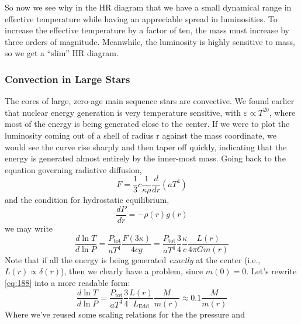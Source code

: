 \documentclass[10pt]{article}
\numberwithin{equation}{section}
\newcommand{\n}{\noindent}
\begin{document}
		\n So now we see why in the HR diagram that we have a small dynamical range
		in effective temperature while having an appreciable spread in luminosities.
		To increase the effective temperature by a factor of ten, the mass must
		increase by three orders of magnitude. Meanwhile, the luminosity is highly
		sensitive to mass, so we get a ``slim'' HR diagram.

    \subsubsection{Convection in Large Stars}
    \label{sec:conv-large-stars}

    The cores of large, zero-age main sequence stars are
    convective. We found earlier that nuclear energy generation is very
    temperature sensitive, with $\varepsilon\propto T^{20}$, where
    most of the energy is being generated close to the center. If we
    were to plot the luminosity coming out of a shell of radius r
    against the mass coordinate, we would see the curve rise sharply
    and then taper off quickly, indicating that the energy is
    generated almost entirely by the inner-most mass. Going back to
    the equation governing radiative diffusion, 
    \begin{equation}
      \label{eq:187}
      F=\frac{1}{3}c\frac{1}{\kappa\rho}\frac{d}{dr}\left(aT^4\right)
    \end{equation}
    and the condition for hydrostatic equilibrium,
    \begin{equation}
      \label{eq:189}
      \frac{dP}{dr}=-\rho(r)g(r)
    \end{equation}
    we may write
    \begin{equation}
      \label{eq:188}
      \frac{d\ln T}{d\ln
        P}=\frac{P_{\mathrm{tot}}}{aT^4}\frac{F(3\kappa)}{4c
        g}=\frac{P_{\mathrm{tot}}}{aT^4}\frac{3}{4}\frac{\kappa}{c}\frac{L
(r)}{4\pi Gm(r)}
    \end{equation}
    Note that if all the energy is being generated \emph{exactly} at
    the center (i.e., $L(r)\propto \delta(r)$), then we clearly have a
    problem, since $m(0)=0$. Let's rewrite \eqref{eq:188} into a more
    readable form:
    \begin{equation}
      \label{eq:190}
      \frac{d\ln T}{d\ln
        P}=\frac{P_{\mathrm{tot}}}{aT^4}\frac{3}{4}\frac{L(r)}{L_{\mathrm
{Edd}}}\frac{M}{m(r)}\approx
      0.1\frac{M}{m(r)}
    \end{equation}
    Where we've reused some scaling relations for the the pressure and
\end{document}
